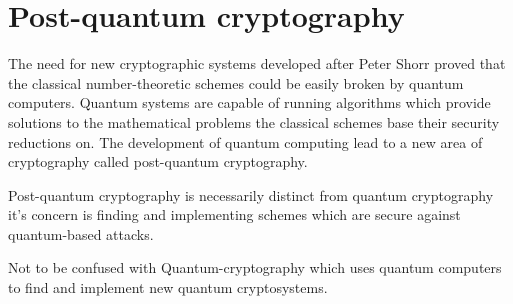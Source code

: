 \section{Post-quantum cryptography} 
The need for new cryptographic systems developed after Peter Shorr proved that the classical number-theoretic schemes could be easily broken by quantum computers. Quantum systems are capable of running algorithms which provide solutions to the mathematical problems the classical schemes base their security reductions on. The development of quantum computing lead to a new area of cryptography called post-quantum cryptography. 
 
Post-quantum cryptography is necessarily distinct from quantum cryptography it's concern is finding and implementing schemes which are secure against quantum-based attacks.
 
Not to be confused with Quantum-cryptography which uses quantum computers to find and implement new quantum cryptosystems.
